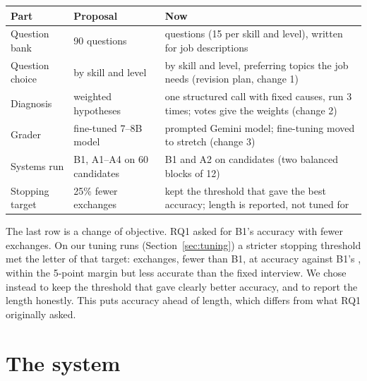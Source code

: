 \documentclass[11pt,a4paper]{article}
\begin{document}
\begin{table}[h]
\centering\small
\begin{tabularx}{\linewidth}{@{}l p{4.3cm} X@{}}
\toprule
Part & Proposal & Now \\
\midrule
Question bank & 90 questions & \nQuestions{} questions (15 per skill and level), written for \nJobs{} job descriptions \\
Question choice & by skill and level & by skill and level, preferring topics the job needs (revision plan, change 1) \\
Diagnosis & weighted hypotheses & one structured call with fixed causes, run 3 times; votes give the weights (change 2) \\
Grader & fine-tuned 7--8B model & prompted Gemini model; fine-tuning moved to stretch (change 3) \\
Systems run & B1, A1--A4 on 60 candidates & B1 and A2 on \nCandidates{} candidates (two balanced blocks of 12) \\
Stopping target & 25\% fewer exchanges & kept the threshold that gave the best accuracy; length is reported, not tuned for \\
\bottomrule
\end{tabularx}
\end{table}

The last row is a change of objective. RQ1 asked for B1's accuracy with fewer exchanges. On our
tuning runs (Section~\ref{sec:tuning}) a stricter stopping threshold met the letter of that target:
\stubExchShort{} exchanges, \stubShortReduction{} fewer than B1, at \stubAccShort{} accuracy against
B1's \stubAccBaseExact{}, within the 5-point margin but less accurate than the fixed interview. We
chose instead to keep the threshold that gave clearly better accuracy, and to report the length
honestly. This puts accuracy ahead of length, which differs from what RQ1 originally asked.

\section{The system}
\end{document}
